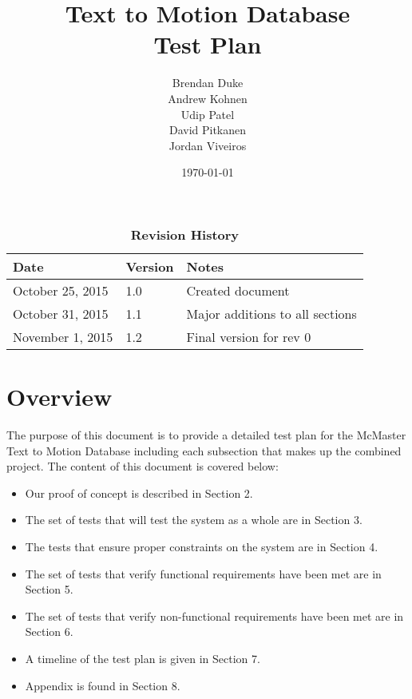 \documentclass{scrreprt}
\begin{document}
\title{\bf Text to Motion Database\\[\baselineskip]\Large Test Plan}
\author{Brendan Duke\\Andrew Kohnen\\Udip Patel\\David Pitkanen\\Jordan Viveiros}
\date{\today}
	
\maketitle

\tableofcontents
\listoftables
\listoffigures


\begin{table}[bp]
\caption*{\bf Revision History}
\begin{tabularx}{\textwidth}{p{3.5cm}p{2cm}X}
\toprule {\bf Date} & {\bf Version} & {\bf Notes}\\
\midrule
October 25, 2015 & 1.0 & Created document\\
October 31, 2015 & 1.1 & Major additions to all sections\\
November 1, 2015 & 1.2 & Final version for rev 0\\
\bottomrule
\end{tabularx}
\end{table}

\newpage


\chapter{Overview}
The purpose of this document is to provide a detailed test plan for the McMaster Text to Motion Database including each subsection that makes up the combined project. The content of this document is covered below:

\begin{itemize}
  \item Our proof of concept is described in Section 2.
  \item The set of tests that will test the system as a whole are in Section 3.
  \item The tests that ensure proper constraints on the system are in Section 4.
  \item The set of tests that verify functional requirements have been met are in Section 5.
  \item The set of tests that verify non-functional requirements have been met are in Section 6.
  \item A timeline of the test plan is given in Section 7.
  \item Appendix is found in Section 8.
\end{itemize} 
\end{document}
